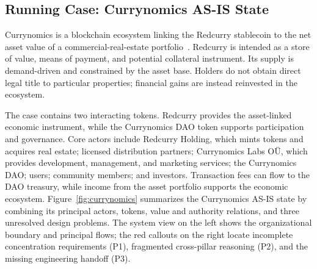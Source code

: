 \documentclass[referee,sn-basic]{sn-jnl}
\begin{document}
\subsection{Running Case: Currynomics AS-IS State}\label{subsec:running-case}

Currynomics is a blockchain ecosystem linking the Redcurry stablecoin to the
net asset value of a commercial-real-estate portfolio~\cite{RedCurry2023}.
Redcurry is intended as a store of value, means of payment, and potential
collateral instrument. Its supply is demand-driven and constrained by the asset
base. Holders do not obtain direct legal title to particular properties;
financial gains are instead reinvested in the ecosystem.

The case contains two interacting tokens. Redcurry provides the asset-linked
economic instrument, while the Currynomics DAO token supports participation and
governance. Core actors include Redcurry Holding, which mints tokens and
acquires real estate; licensed distribution partners; Currynomics Labs OÜ,
which provides development, management, and marketing services; the
Currynomics DAO; users; community members; and investors. Transaction fees can
flow to the DAO treasury, while income from the asset portfolio supports the
economic ecosystem. Figure~\ref{fig:currynomics} summarizes the Currynomics
AS-IS state by combining its principal actors, tokens, value and authority
relations, and three unresolved design problems. The system view on the left
shows the organizational boundary and principal flows; the red callouts on the
right locate incomplete concentration requirements (P1), fragmented
cross-pillar reasoning (P2), and the missing engineering handoff (P3).
\end{document}

